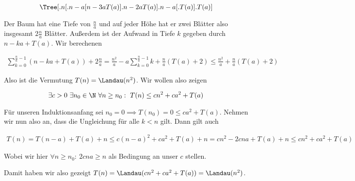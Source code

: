 \begin{solution}
\begin{align*}
\Tree [.n [.n-a [ n-3a T(a) ].n-2a T(a) ].n-a [.T(a) ].T(a) ]
\end{align*}

Der Baum hat eine Tiefe von $\frac{n}{a}$ und auf jeder Höhe hat er zwei Blätter also insgesamt $2\frac{n}{a}$ Blätter. Außerdem ist der Aufwand in Tiefe $k$ gegeben durch $n - ka + T(a)$. Wir berechenen

\begin{align*}
  \sum_{k=0}^{\frac{n}{a} - 1} (n - ka + T(a)) + 2 \frac{n}{a}
  =
  \frac{n^2}{a} - a\sum_{k = 0}^{\frac{n}{a} - 1} k + \frac{n}{a} (T(a) + 2)
  \leq
  \frac{n^2}{a} + \frac{n}{a}(T(a) + 2)
\end{align*}

Also ist die Vermutung $T(n) = \Landau(n^2)$. Wir wollen also zeigen

\begin{align*}
\exists c >0 \ \exists n_0 \in \N \ \forall n \geq n_0 :~ T(n) \leq c n^2 + c a^2 + T(a)
\end{align*}

Für unseren Induktionsanfang sei $n_0 = 0 \implies T(n_0) = 0 \leq c a^2 + T(a)$. Nehmen wir nun also an, dass die Ungleichung für alle $k < n$ gilt. Dann gilt auch

\begin{align*}
  T(n)
  =
  T(n-a) + T(a) + n
  \leq
  c (n - a)^2 + c a^2 + T(a) + n
  =
  cn^2 - 2cna + T(a) + n
  \leq
  c n^2 + c a^2 + T(a)
\end{align*}

Wobei wir hier $\forall n \geq n_0 :~ 2cna \geq n$ als Bedingung an unser $c$ stellen.

Damit haben wir also gezeigt $T(n) = \Landau(c n^2 +c a^2 + T(a)) = \Landau(n^2)$.
\end{solution}

